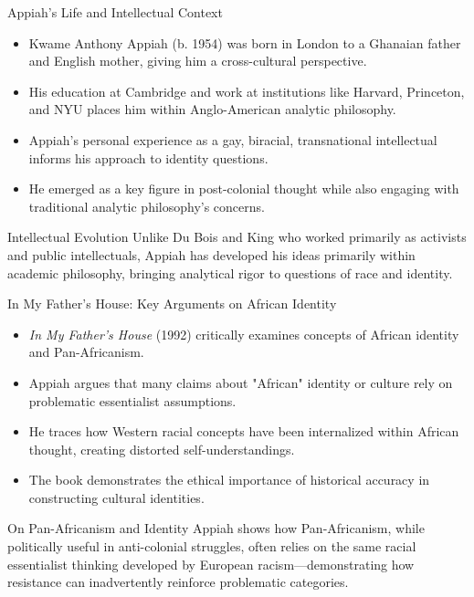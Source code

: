 \documentclass{beamer}
\begin{document}
	\begin{frame}{Appiah's Life and Intellectual Context}
		\begin{itemize}
			\item Kwame Anthony Appiah (b. 1954) was born in London to a Ghanaian father and English mother, giving him a cross-cultural perspective.
			\item His education at Cambridge and work at institutions like Harvard, Princeton, and NYU places him within Anglo-American analytic philosophy.
			\item Appiah's personal experience as a gay, biracial, transnational intellectual informs his approach to identity questions.
			\item He emerged as a key figure in post-colonial thought while also engaging with traditional analytic philosophy's concerns.
		\end{itemize}
		
		\begin{alertblock}{Intellectual Evolution}
			Unlike Du Bois and King who worked primarily as activists and public intellectuals, Appiah has developed his ideas primarily within academic philosophy, bringing analytical rigor to questions of race and identity.
		\end{alertblock}
	\end{frame}
	
	\begin{frame}{In My Father's House: Key Arguments on African Identity}
		\begin{itemize}
			\item \textit{In My Father's House} (1992) critically examines concepts of African identity and Pan-Africanism.
			\item Appiah argues that many claims about "African" identity or culture rely on problematic essentialist assumptions.
			\item He traces how Western racial concepts have been internalized within African thought, creating distorted self-understandings.
			\item The book demonstrates the ethical importance of historical accuracy in constructing cultural identities.
		\end{itemize}
		
		\begin{block}{On Pan-Africanism and Identity}
			Appiah shows how Pan-Africanism, while politically useful in anti-colonial struggles, often relies on the same racial essentialist thinking developed by European racism—demonstrating how resistance can inadvertently reinforce problematic categories.
		\end{block}
	\end{frame}
	
\end{document}
